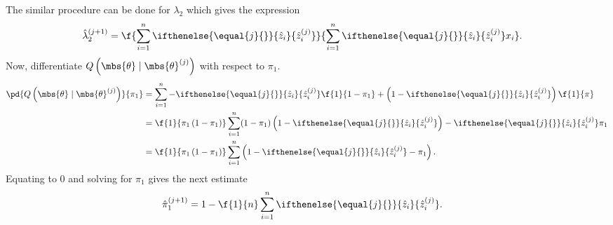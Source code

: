 \documentclass{tufte-handout}
\newcommand{\zhat}[2][{}]{\ifthenelse{\equal{#1}{}}{\hat{z}_{#2}}{\hat{z}_{#2}^{(#1)}}}
\begin{document}
    The similar procedure can be done for $\lambda_{2}$ which gives the expression
    \begin{align}
        \hat{\lambda}_{2}^{(j+1)} 
        &= 
        \f{
            \sum_{i=1}^{n} \zhat[j]{i}
        }{
            \sum_{i=1}^{n}\zhat[j]{i} x_{i}  
        }.
    \end{align}
    Now, differentiate $Q\left(\mbs{\theta}\mid\mbs{\theta}^{(j)}\right)$ with respect to $\pi_{1}$.
    \begin{align}
        \pd{
            Q\left( \mbs{\theta}\mid\mbs{\theta}^{(j)} \right)
        }{
            \pi_{1}
        }
        &=
        \sum_{i=1}^{n}-\zhat[j]{i}\f{1}{1-\pi_{1}} + \left(1-\zhat[j]{i}\right)\f{1}{ \pi}\\
        &=
        \f{1}{\pi_{1}\left( 1-\pi_{1} \right)}\sum_{i=1}^{n} (1-\pi_{1})\left(1-\zhat[j]{i}\right) -\zhat[j]{i}\pi_{1}\\
        &=
        \f{1}{\pi_{1}\left( 1-\pi_{1} \right)}\sum_{i=1}^{n}\left(1 -\zhat[j]{i} - \pi_{1}\right).
    \end{align}
    Equating to $0$ and solving for $\pi_{1}$ gives the next estimate
    \begin{align}
        \hat{\pi}_{1}^{(j+1)} &= 1 - \f{1}{n}\sum_{i=1}^{n}\zhat[j]{i}.
    \end{align}

    
    
\end{document}
